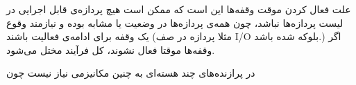 علت فعال کردن موقت وقفه‌ها این است که ممکن است هیچ پردازه‌ی قابل اجرایی در لیست پردازه‌ها نباشد، چون همه‌ی پردازه‌ها در وضعیت
یا مشابه بوده و نیازمند وقوع یک وقفه برای ادامه‌ی فعالیت باشند (مثلا پردازه در صف I/O بلوکه شده باشد.) اگر وقفه‌ها موقتا فعال نشوند، کل فرآیند مختل می‌شود.

در پرازنده‌های چند هسته‌ای به چنین مکانیزمی نیاز نیست چون